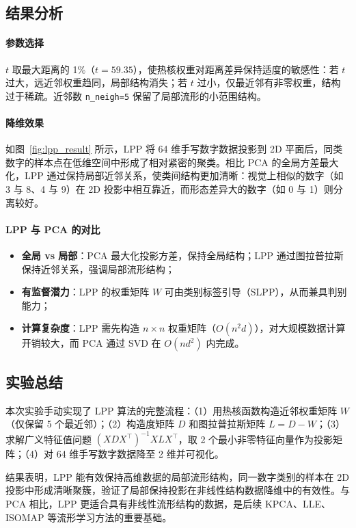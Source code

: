 \documentclass[10.5pt]{config}
\begin{document}
\subsection{结果分析}

\paragraph{参数选择}
$t$ 取最大距离的 1\%（$t = 59.35$），使热核权重对距离差异保持适度的敏感性：若 $t$ 过大，远近邻权重趋同，局部结构消失；若 $t$ 过小，仅最近邻有非零权重，结构过于稀疏。近邻数 \texttt{n\_neigh=5} 保留了局部流形的小范围结构。

\paragraph{降维效果}
如图~\ref{fig:lpp_result} 所示，LPP 将 64 维手写数字数据投影到 2D 平面后，同类数字的样本点在低维空间中形成了相对紧密的聚类。相比 PCA 的全局方差最大化，LPP 通过保持局部近邻关系，使类间结构更加清晰：视觉上相似的数字（如 3 与 8、4 与 9）在 2D 投影中相互靠近，而形态差异大的数字（如 0 与 1）则分离较好。

\paragraph{LPP 与 PCA 的对比}
\begin{itemize}
    \item \textbf{全局 vs 局部}：PCA 最大化投影方差，保持全局结构；LPP 通过图拉普拉斯保持近邻关系，强调局部流形结构；
    \item \textbf{有监督潜力}：LPP 的权重矩阵 $W$ 可由类别标签引导（SLPP），从而兼具判别能力；
    \item \textbf{计算复杂度}：LPP 需先构造 $n \times n$ 权重矩阵（$O(n^2 d)$），对大规模数据计算开销较大，而 PCA 通过 SVD 在 $O(nd^2)$ 内完成。
\end{itemize}

\subsection{实验总结}

本次实验手动实现了 LPP 算法的完整流程：（1）用热核函数构造近邻权重矩阵 $W$（仅保留 5 个最近邻）；（2）构造度矩阵 $D$ 和图拉普拉斯矩阵 $L = D - W$；（3）求解广义特征值问题 $(XDX^\top)^{-1}XLX^\top$，取 2 个最小非零特征向量作为投影矩阵；（4）对 64 维手写数字数据降至 2 维并可视化。

结果表明，LPP 能有效保持高维数据的局部流形结构，同一数字类别的样本在 2D 投影中形成清晰聚簇，验证了局部保持投影在非线性结构数据降维中的有效性。与 PCA 相比，LPP 更适合具有非线性流形结构的数据，是后续 KPCA、LLE、ISOMAP 等流形学习方法的重要基础。
\end{document}
